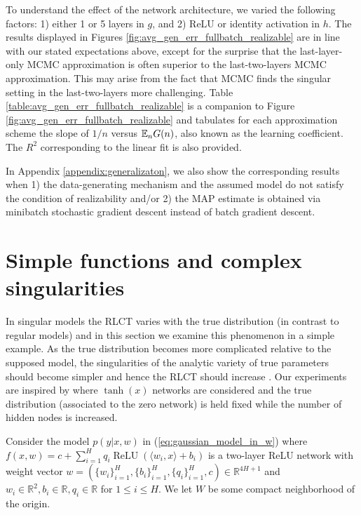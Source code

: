 \documentclass{article} %
\begin{document}
To understand the effect of the network architecture, we varied the following factors:  1) either 1 or 5 layers in $g$, and 2) ReLU or identity activation in $h$.
The results displayed in Figures \ref{fig:avg_gen_err_fullbatch_realizable} are in line with our stated expectations above, except for the surprise that the last-layer-only MCMC approximation is often superior to the last-two-layers MCMC approximation. This may arise from the fact that MCMC finds the singular setting in the last-two-layers more challenging. Table \ref{table:avg_gen_err_fullbatch_realizable} is a companion to Figure \ref{fig:avg_gen_err_fullbatch_realizable} and tabulates for each approximation scheme the slope of $1/n$ versus ${\mathbb{E}}_n G(n)$, also known as the learning coefficient. The $R^2$ corresponding to the linear fit is also provided. 


In Appendix \ref{appendix:generalizaton}, we also show the corresponding results when 1) the data-generating mechanism and the assumed model do not satisfy the condition of realizability and/or 2) the MAP estimate is obtained via minibatch stochastic gradient descent instead of batch gradient descent. 



\section{Simple functions and complex singularities}\label{section:simple_func}

In singular models the RLCT varies with the true distribution (in contrast to regular models) and in this section we examine this phenomenon in a simple example. As the true distribution becomes more complicated relative to the supposed model, the singularities of the analytic variety of true parameters should become simpler and hence the RLCT should increase \citep[\S 7.6]{watanabe_algebraic_2009}. Our experiments are inspired by \citep[\S 7.2]{watanabe_algebraic_2009} where $\operatorname{tanh}(x)$ networks are considered and the true distribution (associated to the zero network) is held fixed while the number of hidden nodes is increased.

Consider the model $p(y|x,w)$ in (\ref{eq:gaussian_model_in_w}) where
$
f(x,w) = c + \sum_{i=1}^H q_i \operatorname{ReLU}( \langle w_i, x \rangle + b_i )
$
is a two-layer ReLU network with weight vector $w = (\{w_i\}_{i=1}^H, \{b_i\}_{i=1}^H, \{q_i\}_{i=1}^H, c) \in \mathbb{R}^{4H+1}$ and $w_i \in \mathbb{R}^2, b_i \in \mathbb{R}, q_i \in \mathbb{R}$ for $1 \le i \le H$. We let $W$ be some compact neighborhood of the origin.
\end{document}
